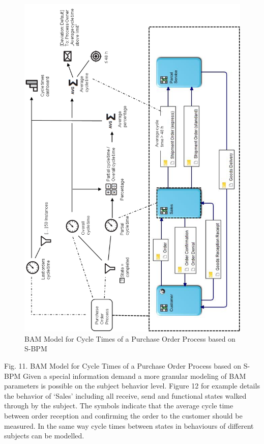\begin{figure}[h]
	\centering
	\includegraphics[width=0.9\linewidth]{Figures/Chapter5/Monitoring/BAM-Model-fo- Cycle-Times-of-a-Purchase-Order-Process-based-on-S-BPM.png}
	\caption[BAM Model for Cycle Times of a Purchase Order Process based on S-BPM]{BAM Model for Cycle Times of a Purchase Order Process based on S-BPM}
	\label{fig:Cycle-Time-SBPM}
\end{figure}


Fig. 11. BAM Model for Cycle Times of a Purchase Order Process based on S-BPM
Given a special information demand a more granular modeling of BAM parameters is possible on the subject behavior level. Figure 12 for example details the behavior of ‘Sales’ including all receive, send and functional states walked through by the subject. The symbols indicate that the average cycle time between order reception and confirming the order to the customer should be measured. In the same way cycle times between states in behaviours of different subjects can be modelled.


